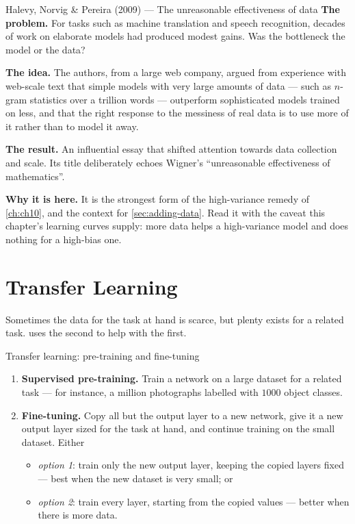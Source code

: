 \begin{researchspotlight}{Halevy, Norvig \& Pereira (2009) --- The unreasonable effectiveness of data}
\textbf{The problem.} For tasks such as machine translation and speech
recognition, decades of work on elaborate models had produced modest gains. Was
the bottleneck the model or the data?

\textbf{The idea.} The authors, from a large web company, argued from experience
with web-scale text that simple models with very large amounts of data --- such
as $n$-gram statistics over a trillion words --- outperform sophisticated models
trained on less, and that the right response to the messiness of real data is
to use more of it rather than to model it away.

\textbf{The result.} An influential essay that shifted attention towards data
collection and scale. Its title deliberately echoes Wigner's ``unreasonable
effectiveness of mathematics''.

\textbf{Why it is here.} It is the strongest form of the high-variance remedy of
\cref{ch:ch10}, and the context for \cref{sec:adding-data}. Read it with the
caveat this chapter's learning curves supply: more data helps a high-variance
model and does nothing for a high-bias one.
\parencite{halevy2009}
\end{researchspotlight}

\section{Transfer Learning}
\label{sec:transfer}

Sometimes the data for the task at hand is scarce, but plenty exists for a
related task.  uses the second to help with the first.

\begin{defbox}{Transfer learning: pre-training and fine-tuning}
\begin{enumerate}
  \item \textbf{Supervised pre-training.} Train a network on a large dataset for
        a related task --- for instance, a million photographs labelled with
        $1000$ object classes.
  \item \textbf{Fine-tuning.} Copy all but the output layer to a new network,
        give it a new output layer sized for the task at hand, and continue
        training on the small dataset. Either
        \begin{itemize}
          \item \emph{option 1}: train only the new output layer, keeping the
                copied layers fixed --- best when the new dataset is very small;
                or
          \item \emph{option 2}: train every layer, starting from the copied
                values --- better when there is more data.
        \end{itemize}
\end{enumerate}
\end{defbox}

